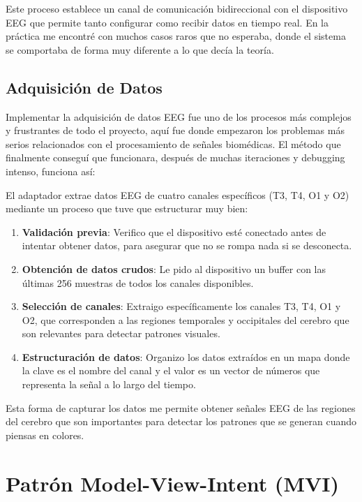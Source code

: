 Este proceso establece un canal de comunicación bidireccional con el dispositivo EEG que permite tanto configurar como recibir datos en tiempo real. En la práctica me encontré con muchos casos raros que no esperaba, donde el sistema se comportaba de forma muy diferente a lo que decía la teoría.

\subsection{Adquisición de Datos}

Implementar la adquisición de datos EEG fue uno de los procesos más complejos y frustrantes de todo el proyecto, aquí fue donde empezaron los problemas más serios relacionados con el procesamiento de señales biomédicas. El método que finalmente conseguí que funcionara, después de muchas iteraciones y debugging intenso, funciona así:

El adaptador extrae datos EEG de cuatro canales específicos (T3, T4, O1 y O2) mediante un proceso que tuve que estructurar muy bien:

\begin{enumerate}
    \item \textbf{Validación previa}: Verifico que el dispositivo esté conectado antes de intentar obtener datos, para asegurar que no se rompa nada si se desconecta.
    
    \item \textbf{Obtención de datos crudos}: Le pido al dispositivo un buffer con las últimas 256 muestras de todos los canales disponibles.
    
    \item \textbf{Selección de canales}: Extraigo específicamente los canales T3, T4, O1 y O2, que corresponden a las regiones temporales y occipitales del cerebro que son relevantes para detectar patrones visuales.
    
    \item \textbf{Estructuración de datos}: Organizo los datos extraídos en un mapa donde la clave es el nombre del canal y el valor es un vector de números que representa la señal a lo largo del tiempo.
\end{enumerate}

Esta forma de capturar los datos me permite obtener señales EEG de las regiones del cerebro que son importantes para detectar los patrones que se generan cuando piensas en colores.

\section{Patrón Model-View-Intent (MVI)}

